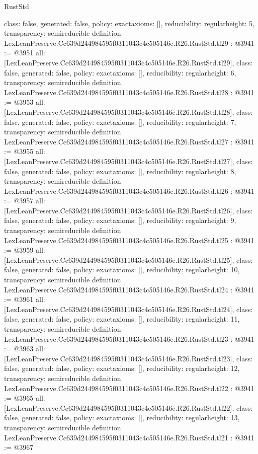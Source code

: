 \begin{lexlean}{RustStd}
\begin{coremodule}
{  class: false,
  generated: false,
  policy: exact{axioms: []},
  reducibility: regular{height: 5},
  transparency: semireducible
}
definition LexLeanPreserve.Cc639d244984595f0311043c4c505146e.R26.RustStd.tl29 : @3941 := @3951 {
  all: [LexLeanPreserve.Cc639d244984595f0311043c4c505146e.R26.RustStd.tl29],
  class: false,
  generated: false,
  policy: exact{axioms: []},
  reducibility: regular{height: 6},
  transparency: semireducible
}
definition LexLeanPreserve.Cc639d244984595f0311043c4c505146e.R26.RustStd.tl28 : @3941 := @3953 {
  all: [LexLeanPreserve.Cc639d244984595f0311043c4c505146e.R26.RustStd.tl28],
  class: false,
  generated: false,
  policy: exact{axioms: []},
  reducibility: regular{height: 7},
  transparency: semireducible
}
definition LexLeanPreserve.Cc639d244984595f0311043c4c505146e.R26.RustStd.tl27 : @3941 := @3955 {
  all: [LexLeanPreserve.Cc639d244984595f0311043c4c505146e.R26.RustStd.tl27],
  class: false,
  generated: false,
  policy: exact{axioms: []},
  reducibility: regular{height: 8},
  transparency: semireducible
}
definition LexLeanPreserve.Cc639d244984595f0311043c4c505146e.R26.RustStd.tl26 : @3941 := @3957 {
  all: [LexLeanPreserve.Cc639d244984595f0311043c4c505146e.R26.RustStd.tl26],
  class: false,
  generated: false,
  policy: exact{axioms: []},
  reducibility: regular{height: 9},
  transparency: semireducible
}
definition LexLeanPreserve.Cc639d244984595f0311043c4c505146e.R26.RustStd.tl25 : @3941 := @3959 {
  all: [LexLeanPreserve.Cc639d244984595f0311043c4c505146e.R26.RustStd.tl25],
  class: false,
  generated: false,
  policy: exact{axioms: []},
  reducibility: regular{height: 10},
  transparency: semireducible
}
definition LexLeanPreserve.Cc639d244984595f0311043c4c505146e.R26.RustStd.tl24 : @3941 := @3961 {
  all: [LexLeanPreserve.Cc639d244984595f0311043c4c505146e.R26.RustStd.tl24],
  class: false,
  generated: false,
  policy: exact{axioms: []},
  reducibility: regular{height: 11},
  transparency: semireducible
}
definition LexLeanPreserve.Cc639d244984595f0311043c4c505146e.R26.RustStd.tl23 : @3941 := @3963 {
  all: [LexLeanPreserve.Cc639d244984595f0311043c4c505146e.R26.RustStd.tl23],
  class: false,
  generated: false,
  policy: exact{axioms: []},
  reducibility: regular{height: 12},
  transparency: semireducible
}
definition LexLeanPreserve.Cc639d244984595f0311043c4c505146e.R26.RustStd.tl22 : @3941 := @3965 {
  all: [LexLeanPreserve.Cc639d244984595f0311043c4c505146e.R26.RustStd.tl22],
  class: false,
  generated: false,
  policy: exact{axioms: []},
  reducibility: regular{height: 13},
  transparency: semireducible
}
definition LexLeanPreserve.Cc639d244984595f0311043c4c505146e.R26.RustStd.tl21 : @3941 := @3967 {
}
\end{coremodule}
\end{lexlean}
